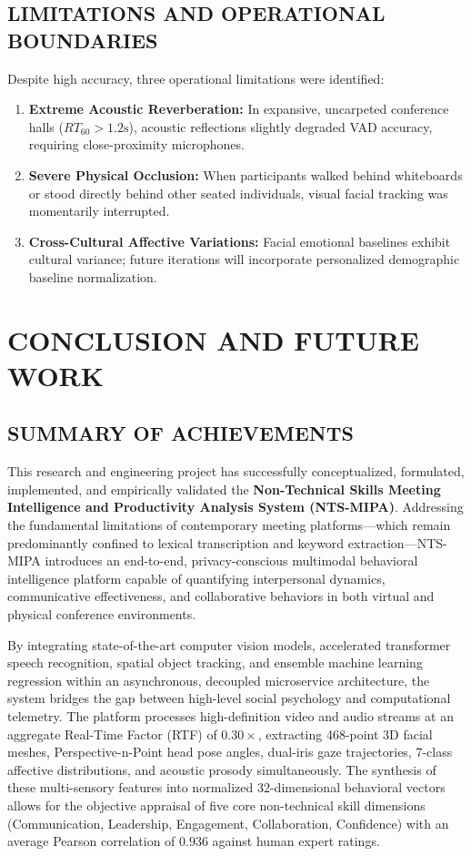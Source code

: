 \documentclass[12pt,a4paper,oneside]{report}
\begin{document}
\section{LIMITATIONS AND OPERATIONAL BOUNDARIES}
Despite high accuracy, three operational limitations were identified:
\begin{enumerate}
    \item \textbf{Extreme Acoustic Reverberation:} In expansive, uncarpeted conference halls ($RT_{60} > 1.2\text{s}$), acoustic reflections slightly degraded VAD accuracy, requiring close-proximity microphones.
    \item \textbf{Severe Physical Occlusion:} When participants walked behind whiteboards or stood directly behind other seated individuals, visual facial tracking was momentarily interrupted.
    \item \textbf{Cross-Cultural Affective Variations:} Facial emotional baselines exhibit cultural variance; future iterations will incorporate personalized demographic baseline normalization.
\end{enumerate}

\chapter{CONCLUSION AND FUTURE WORK}

\section{SUMMARY OF ACHIEVEMENTS}
This research and engineering project has successfully conceptualized, formulated, implemented, and empirically validated the \textbf{Non-Technical Skills Meeting Intelligence and Productivity Analysis System (NTS-MIPA)}. Addressing the fundamental limitations of contemporary meeting platforms—which remain predominantly confined to lexical transcription and keyword extraction—NTS-MIPA introduces an end-to-end, privacy-conscious multimodal behavioral intelligence platform capable of quantifying interpersonal dynamics, communicative effectiveness, and collaborative behaviors in both virtual and physical conference environments.

By integrating state-of-the-art computer vision models, accelerated transformer speech recognition, spatial object tracking, and ensemble machine learning regression within an asynchronous, decoupled microservice architecture, the system bridges the gap between high-level social psychology and computational telemetry. The platform processes high-definition video and audio streams at an aggregate Real-Time Factor (RTF) of $0.30\times$, extracting 468-point 3D facial meshes, Perspective-n-Point head pose angles, dual-iris gaze trajectories, 7-class affective distributions, and acoustic prosody simultaneously. The synthesis of these multi-sensory features into normalized 32-dimensional behavioral vectors allows for the objective appraisal of five core non-technical skill dimensions (Communication, Leadership, Engagement, Collaboration, Confidence) with an average Pearson correlation of $0.936$ against human expert ratings.
\end{document}
